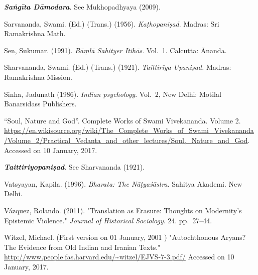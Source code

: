 \begin{thebibliography}{99}
{\sl\bfseries Saṅgīta Dāmodara}. See Mukhopadhyaya (2009).

Sarvananda, Swami. (Ed.) (Trans.) (1956). \textsl{Kaṭhopaniṣad}. Madras: Sri Ramakrishna Math.

Sen, Sukumar. (1991). \textsl{Bāṃlā Sahityer Itihās}. Vol.~1. Calcutta: Ānanda. 

Sharvananda, Swami. (Ed.) (Trans.) (1921). \textsl{Taittirīya-Upaniṣad.} Madras: Ramakrishna Mission.

Sinha, Jadunath (1986). \textsl{Indian psychology}. Vol.~2, New Delhi: Motilal Banarsidass Publishers.

“Soul, Nature and God”. Complete Works of Swami Vivekananda. Volume 2. \url{https://en.wikisource.org/wiki/The_Complete_Works_of_Swami_Vivekananda/Volume_2/Practical_Vedanta_and_other_lectures/Soul,_Nature_and_God}. Accessed on 10 January, 2017. 

{\sl\bfseries Taittiriyopaniṣad}. See Sharvananda (1921).

Vatsyayan, Kapila. (1996). \textsl{Bharata: The Nāṭyaśāstra}. Sahitya Akademi. New Delhi. 

Vázquez, Rolando. (2011). "Translation as Erasure: Thoughts on Modernity's Epistemic Violence." \textsl{Journal of Historical Sociology}. 24. pp.~27--44.

Witzel, Michael. (First version on 01 January, 2001 ) "Autochthonous Aryans? The Evidence from Old Indian and Iranian Texts." \url{http://www.people.fas.harvard.edu/~witzel/EJVS-7-3.pdf/} Accessed on 10 January, 2017. 
\end{thebibliography}
